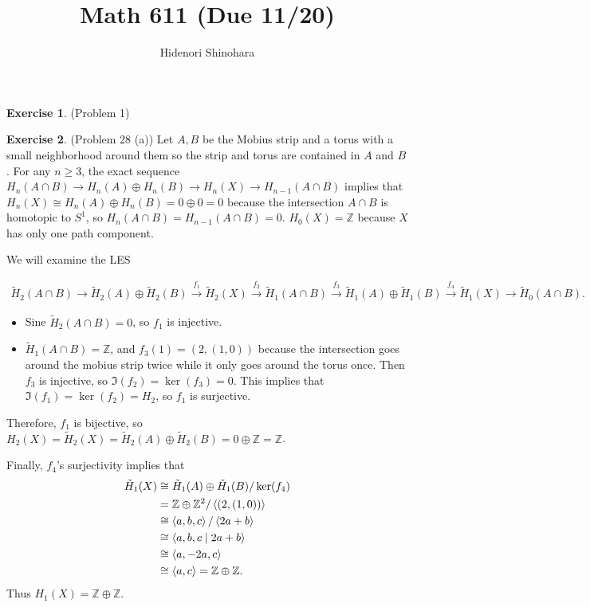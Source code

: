 \documentclass[psamsfonts]{amsart}
\theoremstyle{definition}
\newtheorem*{exer}{Exercise}
\theoremstyle{remark}
\numberwithin{equation}{section}
\begin{document}
\title{Math 611 (Due 11/20)}
\author{Hidenori Shinohara}
\maketitle


\begin{exer}{(Problem 1)}
  \todo[inline,caption={}]{
  }
\end{exer}

\begin{exer}{(Problem 28 (a))}
  Let $A, B$ be the Mobius strip and a torus with a small neighborhood around them so the strip and torus are contained in $A$ and $B$.
  For any $n \geq 3$, the exact sequence $H_n(A \cap B) \rightarrow H_n(A) \oplus H_n(B) \rightarrow H_n(X) \rightarrow H_{n - 1}(A \cap B)$ implies that $H_n(X) \cong H_n(A) \oplus H_n(B) = 0 \oplus 0 = 0$ because the intersection $A \cap B$ is homotopic to $S^1$, so $H_n(A \cap B) = H_{n - 1}(A \cap B) = 0$.
  $H_0(X) = \mathbb{Z}$ because $X$ has only one path component.

  We will examine the LES

  \begin{align*}
    \tilde{H}_2(A \cap B) \rightarrow \tilde{H}_2(A) \oplus \tilde{H}_2(B) \xrightarrow{f_1} \tilde{H}_2(X) 
    \xrightarrow{f_2} \tilde{H}_1(A \cap B) \xrightarrow{f_3} \tilde{H}_1(A) \oplus \tilde{H}_1(B) \xrightarrow{f_4} \tilde{H}_1(X) 
    \rightarrow \tilde{H}_0(A \cap B).
  \end{align*}

  \begin{itemize}
    \item
      Sine $\tilde{H}_2(A \cap B) = 0$, so $f_1$ is injective.
    \item
      $\tilde{H}_1(A \cap B) = \mathbb{Z}$, and $f_3(1) = (2, (1, 0))$ because the intersection goes around the mobius strip twice while it only goes around the torus once.
      Then $f_3$ is injective, so $\Im(f_2) = \ker(f_3) = 0$.
      This implies that $\Im(f_1) = \ker(f_2) = H_2$, so $f_1$ is surjective.
  \end{itemize}

  Therefore, $f_1$ is bijective, so $H_2(X) = \tilde{H}_2(X) = \tilde{H}_2(A) \oplus \tilde{H}_2(B) = 0 \oplus \mathbb{Z} = \mathbb{Z}$.

  Finally, $f_4$'s surjectivity implies that 
  \begin{align*}
    \tilde{H}_1(X)
      &\cong \tilde{H}_1(A) \oplus \tilde{H}_1(B) / \ker(f_4) \\
      &= \mathbb{Z} \oplus \mathbb{Z}^2 / \ev{(2, (1, 0))} \\
      &\cong \ev{a, b, c} / \ev{2a + b} \\
      &\cong \ev{a, b, c \mid 2a + b} \\
      &\cong \ev{a, -2a, c} \\
      &\cong \ev{a, c} = \mathbb{Z} \oplus \mathbb{Z}.
  \end{align*}
  Thus $H_1(X) = \mathbb{Z} \oplus \mathbb{Z}$.
\end{exer}
\end{document}
